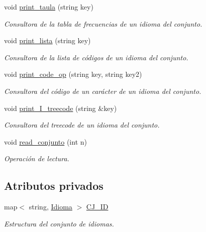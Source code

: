 \begin{DoxyCompactItemize}
void \hyperlink{class_cjt__idiomas_a9839ea44dc8c3ecbb10b32fe869a3498}{print\+\_\+taula} (string key)
\begin{DoxyCompactList}\small\item\em Consultora de la tabla de frecuencias de un idioma del conjunto. \end{DoxyCompactList}\item 
void \hyperlink{class_cjt__idiomas_a0ac0bb2a2fe0cf4abd10d9366da9fa10}{print\+\_\+lista} (string key)
\begin{DoxyCompactList}\small\item\em Consultora de la lista de códigos de un idioma del conjunto. \end{DoxyCompactList}\item 
void \hyperlink{class_cjt__idiomas_afb0c806ea9fb7422f10d7767ef101743}{print\+\_\+code\+\_\+op} (string key, string key2)
\begin{DoxyCompactList}\small\item\em Consultora del código de un carácter de un idioma del conjunto. \end{DoxyCompactList}\item 
void \hyperlink{class_cjt__idiomas_abcb2442285737fae69096a5e05b9a594}{print\+\_\+\+I\+\_\+treecode} (string \&key)
\begin{DoxyCompactList}\small\item\em Consultora del treecode de un idioma del conjunto. \end{DoxyCompactList}\item 
void \hyperlink{class_cjt__idiomas_a09e45083b9df57c02f05bda0bef3d0d3}{read\+\_\+conjunto} (int n)
\begin{DoxyCompactList}\small\item\em Operación de lectura. \end{DoxyCompactList}\end{DoxyCompactItemize}
\subsection*{Atributos privados}
\begin{DoxyCompactItemize}
\item 
map$<$ string, \hyperlink{class_idioma}{Idioma} $>$ \hyperlink{class_cjt__idiomas_aeb67a7100b1345a160fb85466bd4e5f6}{C\+J\+\_\+\+ID}
\begin{DoxyCompactList}\small\item\em Estructura del conjunto de idiomas. \end{DoxyCompactList}\end{DoxyCompactItemize}


